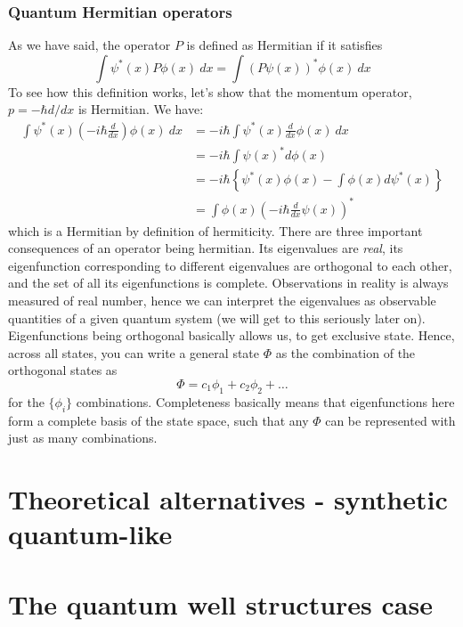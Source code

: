 \subsubsection{Quantum Hermitian operators}
As we have said, the operator $P$ is defined as Hermitian if it satisfies 
\begin{equation}
    \int \psi^{*}(x) P \phi(x) \: dx = \int (P \psi(x))^{*}\phi(x)\: dx
\end{equation}
To see how this definition works, let's show that the momentum operator, $p=-\hbar d/dx$ is Hermitian. We have: 
\begin{align}
    \int \psi^{*}(x) \left(-i\hbar \frac{d}{dx}\right)\phi(x)\: dx 
    & = -i\hbar \int \psi^{*}(x)\frac{d}{dx}\phi(x)\: dx \\
    & = -i\hbar \int \psi(x)^{*} d\phi(x)\\
    & = -i\hbar \left\{ \psi^{*}(x)\phi(x) - \int \phi(x)d\psi^{*}(x) \right\}\\
    & = \int \phi(x)\left(-i\hbar \frac{d}{dx}\psi(x)\right)^{*}
\end{align}
which is a Hermitian by definition of hermiticity. There are three important consequences of an operator being hermitian. Its eigenvalues are \textit{real}, its eigenfunction corresponding to different eigenvalues are orthogonal to each other, and the set of all its eigenfunctions is complete. Observations in reality is always measured of real number, hence we can interpret the eigenvalues as observable quantities of a given quantum system (we will get to this seriously later on). Eigenfunctions being orthogonal basically allows us, to get exclusive state. Hence, across all states, you can write a general state $\Phi$ as the combination of the orthogonal states as 
\begin{equation}
    \Phi = c_{1}\phi_{1} + c_{2}\phi_{2} + \dots 
\end{equation}
for the $\{\phi_{i}\}$ combinations. Completeness basically means that eigenfunctions here form a complete basis of the state space, such that any $\Phi$ can be represented with just as many combinations. 

\clearpage 

\section{Theoretical alternatives - synthetic quantum-like}


\clearpage

\section{The quantum well structures case}

